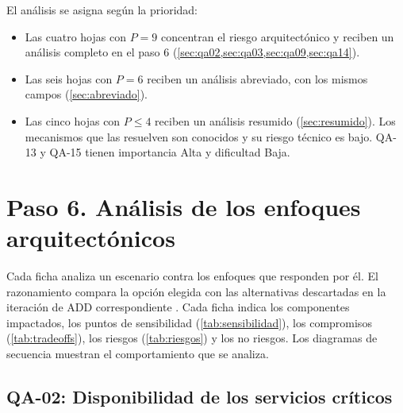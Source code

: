 \documentclass[11pt,letterpaper]{article}
\begin{document}
El análisis se asigna según la prioridad:

\begin{itemize}
  \item Las cuatro hojas con $P = 9$ concentran el riesgo arquitectónico y reciben un análisis
        completo en el paso 6 (\cref{sec:qa02,sec:qa03,sec:qa09,sec:qa14}).
  \item Las seis hojas con $P = 6$ reciben un análisis abreviado, con los mismos campos
        (\cref{sec:abreviado}).
  \item Las cinco hojas con $P \le 4$ reciben un análisis resumido (\cref{sec:resumido}). Los
        mecanismos que las resuelven son conocidos y su riesgo técnico es bajo. QA-13 y QA-15
        tienen importancia Alta y dificultad Baja.
\end{itemize}

\newpage
\section{Paso 6. Análisis de los enfoques arquitectónicos}
\label{sec:paso6}

Cada ficha analiza un escenario contra los enfoques que responden por él. El razonamiento compara
la opción elegida con las alternativas descartadas en la iteración de ADD correspondiente
\cite{iteraciones}. Cada ficha indica los componentes impactados, los puntos de sensibilidad
(\cref{tab:sensibilidad}), los compromisos (\cref{tab:tradeoffs}), los riesgos (\cref{tab:riesgos})
y los no riesgos. Los diagramas de secuencia muestran el comportamiento que se analiza.

\subsection{QA-02: Disponibilidad de los servicios críticos}
\label{sec:qa02}
\end{document}
